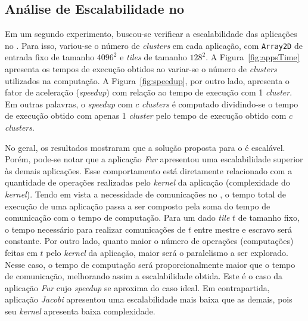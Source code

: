 \subsection{Análise de Escalabilidade no \mppa}

Em um segundo experimento, buscou-se verificar a escalabilidade das aplicações
no \mppa. Para isso, variou-se o número de \textit{clusters} em cada aplicação,
com \texttt{Array2D} de entrada fixo de tamanho $4096^2$ e \textit{tiles} de
tamanho $128^2$. A Figura~\ref{fig:appsTime} apresenta os tempos de execução
obtidos ao variar-se o número de \textit{clusters} utilizados na computação. A
Figura~\ref{fig:speedup}, por outro lado, apresenta o fator de aceleração
(\textit{speedup}) com relação ao tempo de execução com 1 \textit{cluster}. Em
outras palavras, o \textit{speedup} com $c$ \textit{clusters} é computado
dividindo-se o tempo de execução obtido com apenas 1 \textit{cluster} pelo tempo
de execução obtido com $c$ \textit{clusters}.

No geral, os resultados mostraram que a solução proposta para o \mppa é
escalável. Porém, pode-se notar que a aplicação \textit{Fur} apresentou uma
escalabilidade superior às demais aplicações. Esse comportamento está
diretamente relacionado com a quantidade de operações realizadas pelo
\textit{kernel} da aplicação (complexidade do \textit{kernel}). Tendo em vista a
necessidade de comunicações no \mppa, o tempo total de execução de uma aplicação
passa a ser composto pela soma do tempo de comunicação com o tempo de
computação. Para um dado \textit{tile} $t$ de tamanho fixo, o tempo necessário
para realizar comunicações de $t$ entre mestre e escravo será constante. Por
outro lado, quanto maior o número de operações (computações) feitas em $t$ pelo
\textit{kernel} da aplicação, maior será o paralelismo a ser explorado. Nesse
caso, o tempo de computação será proporcionalmente maior que o tempo de
comunicação, melhorando assim a escalabilidade obtida. Este é o caso da
aplicação \textit{Fur} cujo \textit{speedup} se aproxima do caso ideal. Em
contrapartida, aplicação \textit{Jacobi} apresentou uma escalabilidade mais
baixa que as demais, pois seu \textit{kernel} apresenta baixa complexidade.

